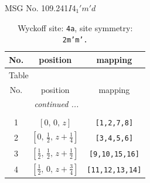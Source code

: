 \documentclass[fleqn,8pt]{jsarticle}
\begin{document}
\setcounter{MaxMatrixCols}{32}

\renewcommand{\tablename}{Table~}
\renewcommand{\figurename}{Figure~}
\begin{center}
\LARGE
MSG No. 109.241\quad$I4_{1}'m'd$
\end{center}
\renewcommand{\arraystretch}{1.2}
\begin{longtable}{ccc}
\caption{Wyckoff site: {\tt 4a}, site symmetry: {\tt 2m'm'.}}
 \\
 \hline \hline
No. & position & mapping \\ \hline \endfirsthead

\multicolumn{2}{l}{\tablename\ \thetable{}} \\
 \hline \hline
No. & position & mapping \\ \hline \endhead

 \hline \hline
\multicolumn{2}{r}{\footnotesize\it continued ...} \\ \endfoot

 \hline \hline
\multicolumn{2}{r}{} \\ \endlastfoot

1 & $\left[ 0,\, 0,\, z \right]$ & {\tt [1,2,7,8]} \\ \hline
2 & $\left[ 0,\, \frac{1}{2},\, z + \frac{1}{4} \right]$ & {\tt [3,4,5,6]} \\ \hline
3 & $\left[ \frac{1}{2},\, \frac{1}{2},\, z + \frac{1}{2} \right]$ & {\tt [9,10,15,16]} \\ \hline
4 & $\left[ \frac{1}{2},\, 0,\, z + \frac{3}{4} \right]$ & {\tt [11,12,13,14]} \\
\end{longtable}
\renewcommand{\arraystretch}{1.2}
\end{document}
